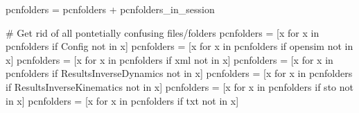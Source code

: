 \documentclass[
  letterpaper,
  DIV=11,
  numbers=noendperiod]{scrreprt}
\newenvironment{Shaded}{\begin{snugshade}}{\end{snugshade}}
\newcommand{\CommentTok}[1]{\textcolor[rgb]{0.37,0.37,0.37}{#1}}
\newcommand{\ControlFlowTok}[1]{\textcolor[rgb]{0.00,0.23,0.31}{#1}}
\newcommand{\KeywordTok}[1]{\textcolor[rgb]{0.00,0.23,0.31}{#1}}
\newcommand{\NormalTok}[1]{\textcolor[rgb]{0.00,0.23,0.31}{#1}}
\newcommand{\OperatorTok}[1]{\textcolor[rgb]{0.37,0.37,0.37}{#1}}
\newcommand{\StringTok}[1]{\textcolor[rgb]{0.13,0.47,0.30}{#1}}
\begin{document}
\begin{Shaded}
\begin{Highlighting}[]
\NormalTok{    pcnfolders }\OperatorTok{=}\NormalTok{ pcnfolders }\OperatorTok{+}\NormalTok{ pcnfolders\_in\_session}


\CommentTok{\# Get rid of all pontetially confusing files/folders}
\NormalTok{pcnfolders }\OperatorTok{=}\NormalTok{ [x }\ControlFlowTok{for}\NormalTok{ x }\KeywordTok{in}\NormalTok{ pcnfolders }\ControlFlowTok{if} \StringTok{\textquotesingle{}Config\textquotesingle{}} \KeywordTok{not} \KeywordTok{in}\NormalTok{ x]}
\NormalTok{pcnfolders }\OperatorTok{=}\NormalTok{ [x }\ControlFlowTok{for}\NormalTok{ x }\KeywordTok{in}\NormalTok{ pcnfolders }\ControlFlowTok{if} \StringTok{\textquotesingle{}opensim\textquotesingle{}} \KeywordTok{not} \KeywordTok{in}\NormalTok{ x]}
\NormalTok{pcnfolders }\OperatorTok{=}\NormalTok{ [x }\ControlFlowTok{for}\NormalTok{ x }\KeywordTok{in}\NormalTok{ pcnfolders }\ControlFlowTok{if} \StringTok{\textquotesingle{}xml\textquotesingle{}} \KeywordTok{not} \KeywordTok{in}\NormalTok{ x]}
\NormalTok{pcnfolders }\OperatorTok{=}\NormalTok{ [x }\ControlFlowTok{for}\NormalTok{ x }\KeywordTok{in}\NormalTok{ pcnfolders }\ControlFlowTok{if} \StringTok{\textquotesingle{}ResultsInverseDynamics\textquotesingle{}} \KeywordTok{not} \KeywordTok{in}\NormalTok{ x]}
\NormalTok{pcnfolders }\OperatorTok{=}\NormalTok{ [x }\ControlFlowTok{for}\NormalTok{ x }\KeywordTok{in}\NormalTok{ pcnfolders }\ControlFlowTok{if} \StringTok{\textquotesingle{}ResultsInverseKinematics\textquotesingle{}} \KeywordTok{not} \KeywordTok{in}\NormalTok{ x]}
\NormalTok{pcnfolders }\OperatorTok{=}\NormalTok{ [x }\ControlFlowTok{for}\NormalTok{ x }\KeywordTok{in}\NormalTok{ pcnfolders }\ControlFlowTok{if} \StringTok{\textquotesingle{}sto\textquotesingle{}} \KeywordTok{not} \KeywordTok{in}\NormalTok{ x]}
\NormalTok{pcnfolders }\OperatorTok{=}\NormalTok{ [x }\ControlFlowTok{for}\NormalTok{ x }\KeywordTok{in}\NormalTok{ pcnfolders }\ControlFlowTok{if} \StringTok{\textquotesingle{}txt\textquotesingle{}} \KeywordTok{not} \KeywordTok{in}\NormalTok{ x]}
\end{Highlighting}
\end{Shaded}
\end{document}
